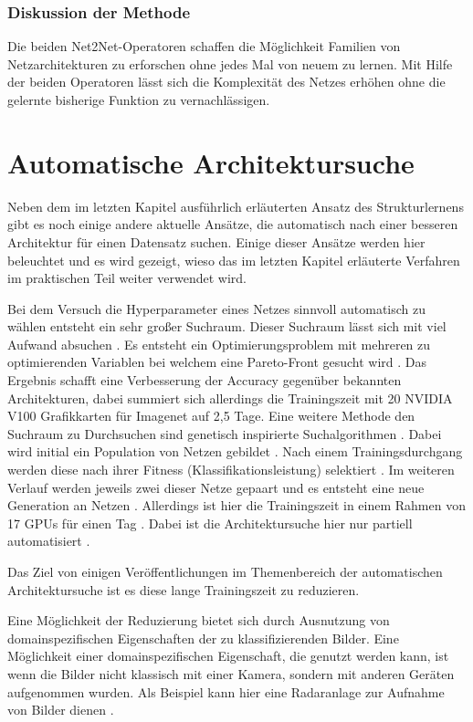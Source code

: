 \subsubsection{Diskussion der Methode}

Die beiden Net2Net-Operatoren schaffen die Möglichkeit Familien von Netzarchitekturen zu erforschen ohne jedes Mal von neuem zu lernen. Mit Hilfe der beiden Operatoren lässt sich die Komplexität des Netzes erhöhen ohne die gelernte bisherige Funktion zu vernachlässigen.




\section{Automatische Architektursuche}\label{sec:auto}
Neben dem im letzten Kapitel ausführlich erläuterten Ansatz des Strukturlernens gibt es noch einige andere aktuelle Ansätze, die automatisch nach einer besseren Architektur für einen Datensatz suchen. Einige dieser Ansätze werden hier beleuchtet und es wird gezeigt, wieso das im letzten Kapitel erläuterte Verfahren im praktischen Teil weiter verwendet wird.

Bei dem Versuch die Hyperparameter eines Netzes sinnvoll automatisch zu wählen entsteht ein sehr großer Suchraum. Dieser Suchraum lässt sich mit viel Aufwand absuchen \cite{dvolver}. Es entsteht ein Optimierungsproblem mit mehreren zu optimierenden Variablen bei welchem eine Pareto-Front gesucht wird \cite{dvolver}. Das Ergebnis schafft eine Verbesserung der Accuracy gegenüber bekannten Architekturen, dabei summiert sich allerdings die Trainingszeit mit 20 NVIDIA V100 Grafikkarten für Imagenet auf 2,5 Tage\cite{dvolver}.
Eine weitere Methode den Suchraum zu Durchsuchen sind genetisch inspirierte Suchalgorithmen \cite{gen}. Dabei wird initial ein Population von Netzen gebildet \cite{gen}. Nach einem Trainingsdurchgang werden diese nach ihrer Fitness (Klassifikationsleistung) selektiert \cite{gen}. Im weiteren Verlauf werden jeweils zwei dieser Netze gepaart und es entsteht eine neue Generation an Netzen \cite{gen}. Allerdings ist hier die Trainingszeit in einem Rahmen von 17 GPUs für einen Tag \cite{gen}. Dabei ist die Architektursuche hier nur partiell automatisiert \cite{gen}.  

Das Ziel von einigen Veröffentlichungen im Themenbereich der automatischen Architektursuche ist es diese lange Trainingszeit zu reduzieren.

Eine Möglichkeit der Reduzierung bietet sich durch Ausnutzung von domainspezifischen Eigenschaften der zu klassifizierenden Bilder. Eine Möglichkeit einer domainspezifischen Eigenschaft, die genutzt werden kann, ist wenn die Bilder nicht klassisch mit einer Kamera, sondern mit anderen Geräten aufgenommen wurden. Als Beispiel kann hier eine Radaranlage zur Aufnahme von Bilder dienen \cite{polsar}.


